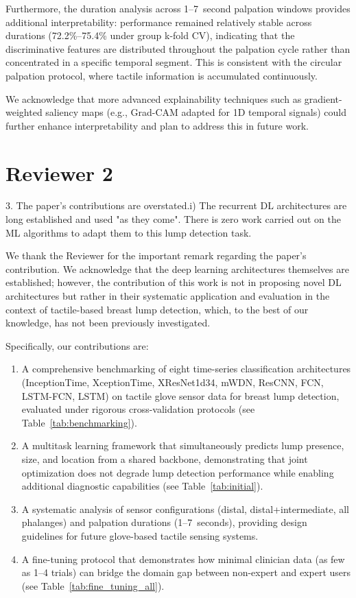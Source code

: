\documentclass[a4paper, onecolumn]{IEEEtran}
\newcommand\blue[1]{{\textcolor{white!30!blue}{#1}}}
\begin{document}
Furthermore, the duration analysis across 1--7~second palpation windows provides additional interpretability: performance remained relatively stable across durations (72.2\%--75.4\% under group k-fold CV), indicating that the discriminative features are distributed throughout the palpation cycle rather than concentrated in a specific temporal segment. This is consistent with the circular palpation protocol, where tactile information is accumulated continuously.

We acknowledge that more advanced explainability techniques such as gradient-weighted saliency maps (e.g., Grad-CAM adapted for 1D temporal signals) could further enhance interpretability and plan to address this in future work.




\section*{Reviewer 2}

\blue{3. The paper's contributions are overstated.i) The recurrent DL architectures are long established and used "as they come". There is zero work carried out on the ML algorithms to adapt them to this lump detection task.}

We thank the Reviewer for the important remark regarding the paper's contribution. We acknowledge that the deep learning architectures themselves are established; however, the contribution of this work is not in proposing novel DL architectures but rather in their systematic application and evaluation in the context of tactile-based breast lump detection, which, to the best of our knowledge, has not been previously investigated.

Specifically, our contributions are:
\begin{enumerate}
    \item A comprehensive benchmarking of eight time-series classification architectures (InceptionTime, XceptionTime, XResNet1d34, mWDN, ResCNN, FCN, LSTM-FCN, LSTM) on tactile glove sensor data for breast lump detection, evaluated under rigorous cross-validation protocols (see Table~\ref{tab:benchmarking}).
    \item A multitask learning framework that simultaneously predicts lump presence, size, and location from a shared backbone, demonstrating that joint optimization does not degrade lump detection performance while enabling additional diagnostic capabilities (see Table~\ref{tab:initial}).
    \item A systematic analysis of sensor configurations (distal, distal+intermediate, all phalanges) and palpation durations (1--7~seconds), providing design guidelines for future glove-based tactile sensing systems.
    \item A fine-tuning protocol that demonstrates how minimal clinician data (as few as 1--4 trials) can bridge the domain gap between non-expert and expert users (see Table~\ref{tab:fine_tuning_all}).
\end{enumerate}
\end{document}
